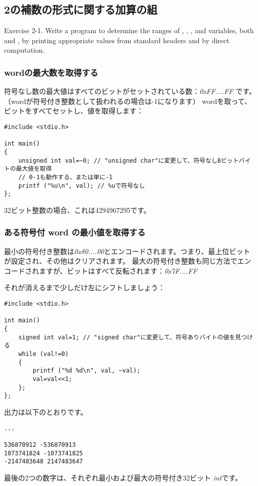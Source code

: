 ﻿\subsection{2の補数の形式に関する加算の組}

\epigraph{Exercise 2-1. Write a program to determine the ranges of , , , and 
variables, both  and , by printing appropriate values from standard headers
and by direct computation.}{\KRBook}

\subsubsection{\gls{word}の最大数を取得する}

符号なし数の最大値はすべてのビットがセットされている数：\emph{0xFF....FF} です。
（\gls{word}が符号付き整数として扱われるの場合は-1になります）
\gls{word}を取って、ビットをすべてセットし、値を取得します：

\begin{lstlisting}[style=customc]
#include <stdio.h>

int main()
{
	unsigned int val=~0; // "unsigned char"に変更して、符号なし8ビットバイトの最大値を取得
	// 0-1も動作する、または単に-1
	printf ("%u\n", val); // %uで符号なし
};
\end{lstlisting}

32ビット整数の場合、これは4294967295です。

\subsubsection{ある符号付 \gls{word} の最小値を取得する}

最小の符号付き整数は\emph{0x80....00}とエンコードされます。つまり、最上位ビットが設定され、その他はクリアされます。
最大の符号付き整数も同じ方法でエンコードされますが、ビットはすべて反転されます：\emph{0x7F....FF}

それが消えるまで少しだけ左にシフトしましょう：

\begin{lstlisting}[style=customc]
#include <stdio.h>

int main()
{
	signed int val=1; // "signed char"に変更して、符号ありバイトの値を見つける
	while (val!=0)
	{
		printf ("%d %d\n", val, ~val);
		val=val<<1;
	};
};
\end{lstlisting}

出力は以下のとおりです。

\begin{lstlisting}
...

536870912 -536870913
1073741824 -1073741825
-2147483648 2147483647
\end{lstlisting}

最後の2つの数字は、それぞれ最小および最大の符号付き32ビット \emph{int}です。
